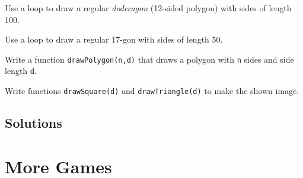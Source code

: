\documentclass[english,11pt,a4paper]{report}
\begin{document}
\begin{ex}
Use a loop to draw a regular \emph{dodecagon} (12-sided polygon) with sides of length 100.
\end{ex}

\begin{ex}
Use a loop to draw a regular  17-gon with sides of length 50.
\end{ex}

\begin{ex}
Write a function \verb|drawPolygon(n,d)| that draws a polygon with \verb|n| sides and side length \verb|d|.
\end{ex}

\begin{ex}
\begin{multicols}{2}
Write functions \verb|drawSquare(d)| and \verb|drawTriangle(d)| to make the shown image.
\end{multicols}
\end{ex}



\newpage
\subsection*{Solutions}
\printcursols
\newpage

\section{More Games}
\end{document}
